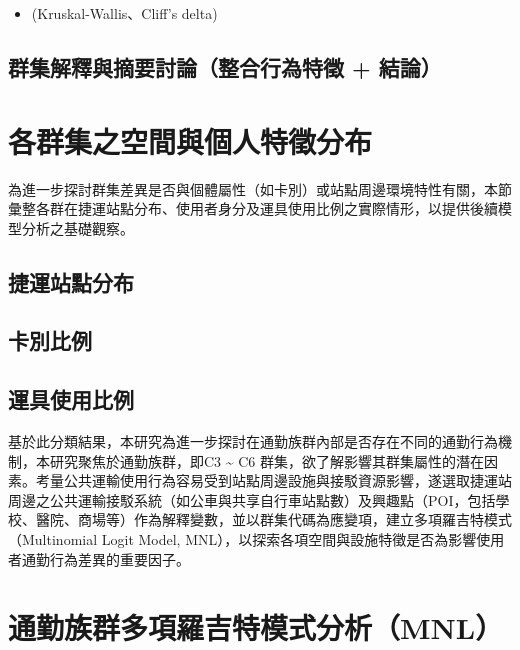 \begin{itemize}
\tightlist
\item
  (Kruskal-Wallis、Cliff's delta)
\end{itemize}

\subsection{群集解釋與摘要討論（整合行為特徵 +
結論）}\label{ux7fa4ux96c6ux89e3ux91cbux8207ux6458ux8981ux8a0eux8ad6ux6574ux5408ux884cux70baux7279ux5fb5-ux7d50ux8ad6}

\section{各群集之空間與個人特徵分布}\label{ux5404ux7fa4ux96c6ux4e4bux7a7aux9593ux8207ux500bux4ebaux7279ux5fb5ux5206ux5e03}

為進一步探討群集差異是否與個體屬性（如卡別）或站點周邊環境特性有關，本節彙整各群在捷運站點分布、使用者身分及運具使用比例之實際情形，以提供後續模型分析之基礎觀察。

\subsection{捷運站點分布}\label{ux6377ux904bux7ad9ux9edeux5206ux5e03}

\subsection{卡別比例}\label{ux5361ux5225ux6bd4ux4f8b}

\subsection{運具使用比例}\label{ux904bux5177ux4f7fux7528ux6bd4ux4f8b}

基於此分類結果，本研究為進一步探討在通勤族群內部是否存在不同的通勤行為機制，本研究聚焦於通勤族群，即C3
\textasciitilde{} C6
群集，欲了解影響其群集屬性的潛在因素。考量公共運輸使用行為容易受到站點周邊設施與接駁資源影響，遂選取捷運站周邊之公共運輸接駁系統（如公車與共享自行車站點數）及興趣點（POI，包括學校、醫院、商場等）作為解釋變數，並以群集代碼為應變項，建立多項羅吉特模式（Multinomial
Logit Model,
MNL），以探索各項空間與設施特徵是否為影響使用者通勤行為差異的重要因子。

\section{通勤族群多項羅吉特模式分析（MNL）}\label{ux901aux52e4ux65cfux7fa4ux591aux9805ux7f85ux5409ux7279ux6a21ux5f0fux5206ux6790mnl}

